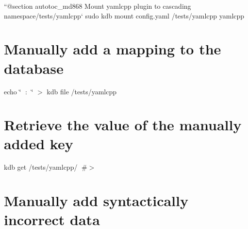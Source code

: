 ``{\ttfamily  @section autotoc\+\_\+md868 Mount yamlcpp plugin to cascading namespace}/tests/yamlcpp` sudo kdb mount config.\+yaml /tests/yamlcpp yamlcpp\hypertarget{autotoc_md865_autotoc_md869}{}\section{Manually add a mapping to the database}\label{autotoc_md865_autotoc_md869}
echo \char`\"{}🔑 \+: 🐳\char`\"{} $>$ {\ttfamily kdb file /tests/yamlcpp} \hypertarget{autotoc_md865_autotoc_md870}{}\section{Retrieve the value of the manually added key}\label{autotoc_md865_autotoc_md870}
kdb get /tests/yamlcpp/🔑 \#$>$ 🐳\hypertarget{autotoc_md865_autotoc_md871}{}\section{Manually add syntactically incorrect data}\label{autotoc_md865_autotoc_md871}
